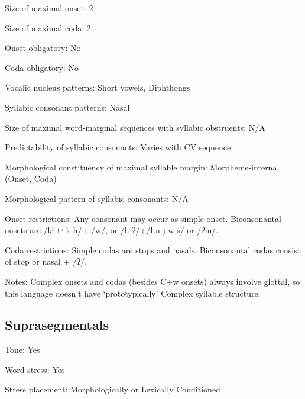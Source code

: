 {\begin{appendixdesc}
\item[Size of maximal onset:] 2

\item[Size of maximal coda:] 2

\item[Onset obligatory:] No

\item[Coda obligatory:] No

\item[Vocalic nucleus patterns:] Short vowels, Diphthongs

\item[Syllabic consonant patterns:] Nasal

\item[Size of maximal word-marginal sequences with syllabic obstruents:] N/A

\item[Predictability of syllabic consonants:] Varies with CV sequence

\item[Morphological constituency of maximal syllable margin:] Morpheme-internal (Onset, Coda)

\item[Morphological pattern of syllabic consonants:] N/A

\item[Onset restrictions:] Any consonant may occur as simple onset. Biconsonantal onsets are /kʰ tʰ k h/+ /w/, or /h ʔ/+/l n j w s/ or /ʔm/.

\item[Coda restrictions:] Simple codas are stops and nasals. Biconsonantal codas consist of stop or nasal + /ʔ/.

\item[Notes:] Complex onsets and codas (besides C+w onsets) always involve glottal, so this language doesn’t have ‘prototypically’ Complex syllable structure.
\end{appendixdesc}
\subsection*{Suprasegmentals}
\begin{appendixdesc}
\item[Tone:] Yes

\item[Word stress:] Yes

\item[Stress placement:] Morphologically or Lexically Conditioned


\end{appendixdesc}}
